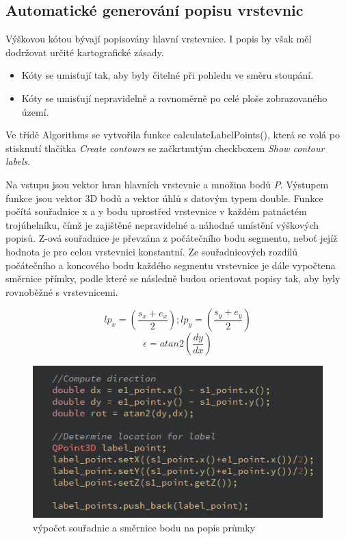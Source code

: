 \documentclass[11pt]{article}
\begin{document}
\subsection{Automatické generování popisu vrstevnic}
Výškovou kótou bývají popisovány hlavní vrstevnice. I popis by však měl dodržovat určité kartografické zásady.
\begin{itemize}
\item Kóty se umisťují tak, aby byly čitelné při pohledu ve směru stoupání.
\item Kóty se umisťují nepravidelně a rovnoměrně po celé ploše zobrazovaného území.
\end{itemize}

Ve třídě Algorithms se vytvořila funkce calculateLabelPoints(), která se volá po stisknutí tlačítka \textit{Create contours} se začkrtnutým checkboxem \textit{Show contour labels}.

Na vstupu jsou vektor hran hlavních vrstevnic a množina bodů $P$. Výstupem funkce jsou vektor 3D bodů a vektor úhlů s datovým typem double. Funkce počítá souřadnice x a y bodu  uprostřed vrstevnice v každém patnáctém trojúhelníku, čímž je zajištěné nepravidelné a náhodné umístění výškových popisů. Z-ová souřadnice je převzána z počátečního bodu segmentu, neboť jejíž hodnota je pro celou vrstevnici konstantní. Ze souřadnicových rozdílů počátečního a koncového bodu každého segmentu vrstevnice je dále vypočtena směrnice přímky, podle které se následně budou orientovat popisy tak, aby byly rovnoběžné s vrstevnicemi.

$$ lp_x = ( \frac{s_x + e_x}{2});  lp_y = ( \frac{s_y + e_y}{2}) $$ 
$$ \epsilon = atan2( \frac{dy}{dx}) $$

\begin{figure}[htbh]
	\centering
	\includegraphics[scale=1]{images/getContourLabels.png} 
	\caption{výpočet souřadnic a směrnice bodu na popis průmky}
	\label{fig:getContourLines()}
\end{figure} 
\end{document}
